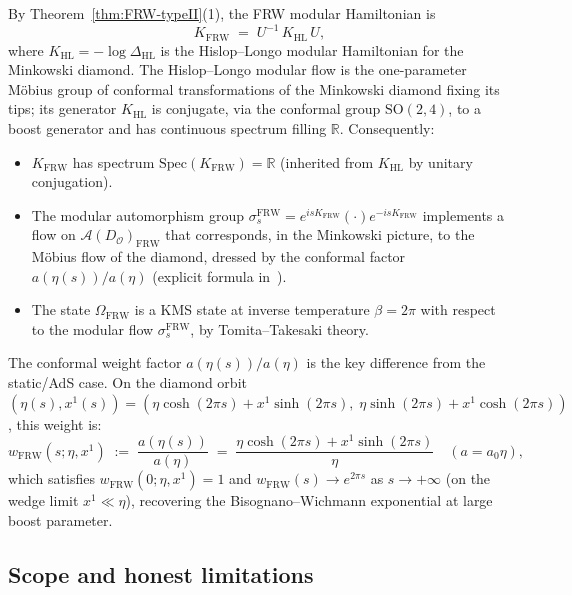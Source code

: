 \documentclass[12pt,a4paper]{article}
\theoremstyle{definition}
\newcommand{\HL}{\mathrm{HL}}
\newcommand{\FRW}{\mathrm{FRW}}
\begin{document}
By Theorem~\ref{thm:FRW-typeII}(1), the FRW modular Hamiltonian is
\begin{equation}
  K_\FRW \;=\; U^{-1}\,K_\HL\,U,
  \label{eq:K-FRW}
\end{equation}
where $K_\HL = -\log\Delta_\HL$ is the Hislop--Longo modular Hamiltonian
for the Minkowski diamond.
The Hislop--Longo modular flow is the one-parameter M\"{o}bius group
of conformal transformations of the Minkowski diamond fixing its tips;
its generator $K_\HL$ is conjugate, via the conformal group
$\mathrm{SO}(2,4)$, to a boost generator and has continuous spectrum
filling $\mathbb{R}$.
Consequently:
\begin{itemize}
\item $K_\FRW$ has spectrum $\mathrm{Spec}(K_\FRW) = \mathbb{R}$
  (inherited from $K_\HL$ by unitary conjugation).
\item The modular automorphism group $\sigma_s^\FRW = e^{isK_\FRW}
  (\cdot) e^{-isK_\FRW}$ implements a flow on $\mathcal{A}(D_\mathcal{O})_\FRW$
  that corresponds, in the Minkowski picture, to the M\"{o}bius flow
  of the diamond, dressed by the conformal factor $a(\eta(s))/a(\eta)$
  (explicit formula in~\cite{FRWconformal}).
\item The state $\Omega_\FRW$ is a KMS state at inverse temperature
  $\beta = 2\pi$ with respect to the modular flow $\sigma_s^\FRW$,
  by Tomita--Takesaki theory.
\end{itemize}

The conformal weight factor $a(\eta(s))/a(\eta)$ is the key difference
from the static/AdS case.
On the diamond orbit $(\eta(s), x^1(s)) = (\eta\cosh(2\pi s) + x^1\sinh(2\pi s),
\; \eta\sinh(2\pi s) + x^1\cosh(2\pi s))$, this weight is:
\begin{equation}
  w_\FRW(s;\eta,x^1) \;:=\; \frac{a(\eta(s))}{a(\eta)}
  \;=\; \frac{\eta\cosh(2\pi s) + x^1\sinh(2\pi s)}{\eta}
  \quad (a = a_0\eta),
  \label{eq:conf-weight}
\end{equation}
which satisfies $w_\FRW(0;\eta,x^1) = 1$ and $w_\FRW(s) \to e^{2\pi s}$
as $s \to +\infty$ (on the wedge limit $x^1 \ll \eta$), recovering
the Bisognano--Wichmann exponential at large boost parameter.

\subsection{Scope and honest limitations}
\end{document}
